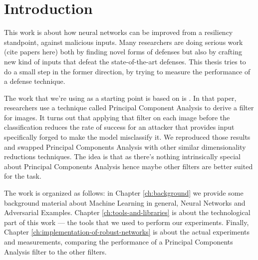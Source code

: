\chapter*{Introduction}

This work is about how neural networks can be improved from a
resiliency standpoint, against malicious inputs. Many researchers are
doing serious work (cite papers here) both by finding novel forms of
defenses but also by crafting new kind of inputs that defeat the
state-of-the-art defenses. This thesis tries to do a small step in the
former direction, by trying to measure the performance of a defense
technique.

The work that we're using as a starting point is based on is
\cite{bhagoji2018enhancing}. In that paper, researchers use a technique
called Principal Component Analysis to derive a filter for images. It
turns out that applying that filter on each image before the
classification reduces the rate of success for an attacker that
provides input specifically forged to make the model misclassify it. We
reproduced those results and swapped Principal Components Analysis with
other similar dimensionality reductions techniques. The idea is that as
there's nothing intrinsically special about Principal Components
Analysis hence maybe other filters are better suited for the task.

The work is organized as follows: in Chapter \ref{ch:background} we
provide some background material about Machine Learning in general,
Neural Networks and Adversarial Examples. Chapter
\ref{ch:tools-and-libraries} is about the technological part of this
work --- the tools that we used to perform our experiments. Finally,
Chapter \ref{ch:implementation-of-robust-networks} is about the actual
experiments and measurements, comparing the performance of a Principal
Components Analysis filter to the other filters.
